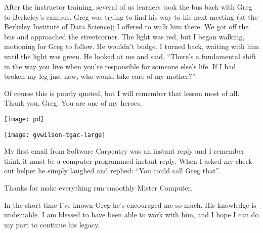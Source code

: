 \newpage

\begin{center}
\begin{minipage}{0.45\textwidth}
\setlength{\parindent}{0in}
\setlength{\parskip}{1em}

After the instructor training, several of us learners took the bus back with
Greg to Berkeley's campus. Greg was trying to find his way to his next meeting
(at the Berkeley Institute of Data Science); I offered to walk him there. We
got off the bus and approached the streetcorner. The light was red, but I began
walking, motioning for Greg to follow. He wouldn't budge. I turned back,
waiting with him until the light was green. He looked at me and said, ``There's
a fundamental shift in the way you live when you're responsible for someone
else's life. If I had broken my leg just now, who would take care of my
mother?''

Of course this is poorly quoted, but I will remember that lesson most of all.
Thank you, Greg. You are one of my heroes.

\end{minipage}
\hfill
\begin{minipage}{0.45\textwidth}
    \texttt{[image: pd]}
\end{minipage}
\end{center}
\vspace*{\fill}

\newpage

\vspace*{\fill}

\begin{center}
\texttt{[image: gvwilson-tgac-large]}
\end{center}

My first email from Software Carpentry was an instant reply and I remember
think it must be a computer programmed instant reply. When I asked my check out
helper he simply laughed and replied: ``You could call Greg that''. 

Thanks for make everything run smoothly Mister Computer.


In the short time I've known Greg he's encouraged me so much. His knowledge is
undeniable. I am blessed to have been able to work with him, and I hope I can
do my part to continue his legacy.

\vspace*{\fill}

